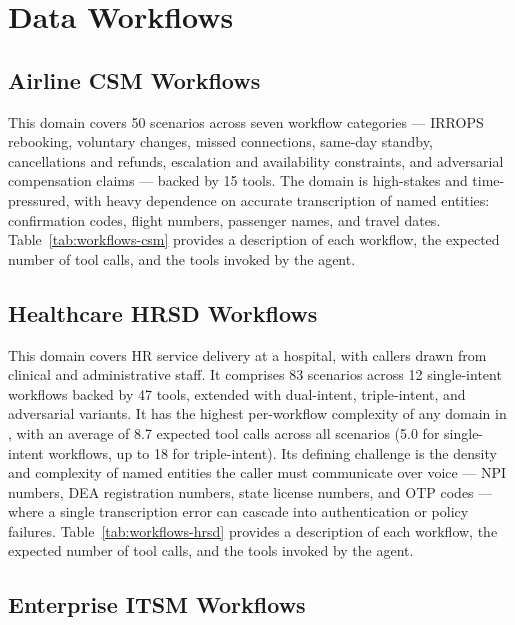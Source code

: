 \clearpage
\section{Data Workflows}
\label{app:workflows}

\subsection{Airline CSM Workflows}
This domain covers 50 scenarios across seven workflow categories — IRROPS rebooking, voluntary changes, missed connections, same-day standby, cancellations and refunds, escalation and availability constraints, and adversarial compensation claims — backed by 15 tools. The domain is high-stakes and time-pressured, with heavy dependence on accurate transcription of named entities: confirmation codes, flight numbers, passenger names, and travel dates. Table~\ref{tab:workflows-csm} provides a description of each workflow, the expected number of tool calls, and the tools invoked by the agent.



\subsection{Healthcare HRSD Workflows}

This domain covers HR service delivery at a hospital, with callers drawn from clinical and administrative staff. It comprises 83 scenarios across 12 single-intent workflows backed by 47 tools, extended with dual-intent, triple-intent, and adversarial variants. It has the highest per-workflow complexity of any domain in \framework, with an average of 8.7 expected tool calls across all scenarios (5.0 for single-intent workflows, up to 18 for triple-intent). Its defining challenge is the density and complexity of named entities the caller must communicate over voice — NPI numbers, DEA registration numbers, state license numbers, and OTP codes — where a single transcription error can cascade into authentication or policy failures. Table~\ref{tab:workflows-hrsd} provides a description of each workflow, the expected number of tool calls, and the tools invoked by the agent.



\subsection{Enterprise ITSM Workflows}


